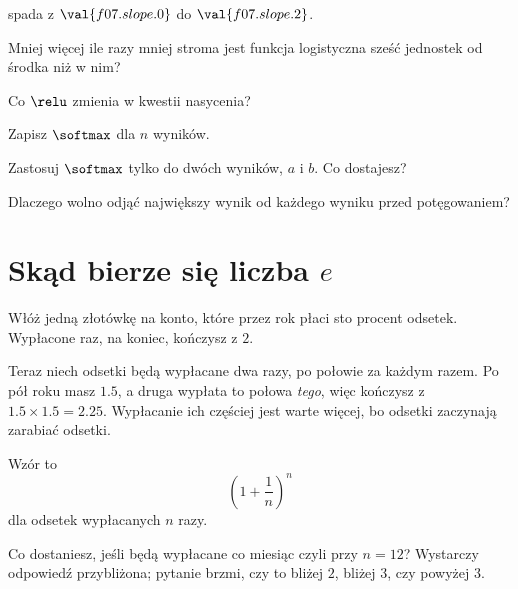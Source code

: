 \begin{quiz}
{  spada z $\val{f07.slope.0}$ do $\val{f07.slope.2}$.}
\item Mniej więcej ile razy mniej stroma jest funkcja logistyczna sześć
  jednostek od środka niż w nim? 
\item Co $\relu$ zmienia w kwestii nasycenia? 
\item Zapisz $\softmax$ dla $n$ wyników. 
\item Zastosuj $\softmax$ tylko do dwóch wyników, $a$ i $b$. Co dostajesz?
\item Dlaczego wolno odjąć największy wynik od każdego wyniku przed
  potęgowaniem? 
\end{quiz}

\section{Skąd bierze się liczba \texorpdfstring{$e$}{e}}
\label{sec:F07-e}

\begin{fr}
Włóż jedną złotówkę na konto, które przez rok płaci sto procent odsetek.
Wypłacone raz, na koniec, kończysz z $2$.

Teraz niech odsetki będą wypłacane dwa razy, po połowie za każdym razem. Po
pół roku masz $\num{1.5}$, a druga wypłata to połowa \emph{tego}, więc
kończysz z $\num{1.5} \times \num{1.5} = \num{2.25}$. Wypłacanie ich częściej
jest warte więcej, bo odsetki zaczynają zarabiać odsetki.

Wzór to
\[ \left(1 + \frac{1}{n}\right)^{n} \]
dla odsetek wypłacanych $n$ razy.

Co dostaniesz, jeśli będą wypłacane co miesiąc \dash{} czyli przy $n = 12$?
Wystarczy odpowiedź przybliżona; pytanie brzmi, czy to bliżej $2$, bliżej $3$,
czy powyżej $3$.
\nextframe
\end{fr}

